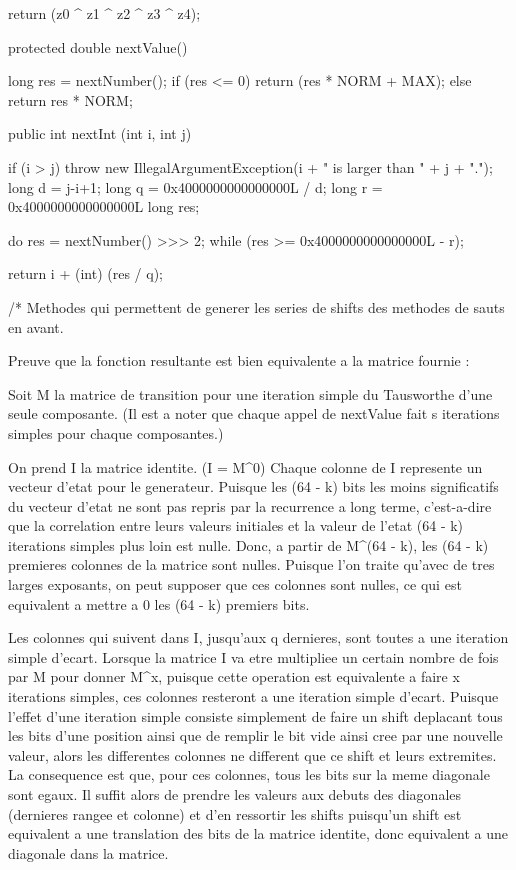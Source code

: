 \begin{code}
\begin{hide}
{       return (z0 ^ z1 ^ z2 ^ z3 ^ z4);
    }


    protected double nextValue() {

        long res = nextNumber();
        if (res <= 0)
            return (res * NORM + MAX);
        else
            return res * NORM;
    }


   public int nextInt (int i, int j) {
      if (i > j)
          throw new IllegalArgumentException(i + " is larger than " + j + ".");
      long d = j-i+1;
      long q = 0x4000000000000000L / d;
      long r = 0x4000000000000000L %
      long res;

      do {
         res = nextNumber() >>> 2;
      } while (res >= 0x4000000000000000L - r);

      return i + (int) (res / q);
   }


    /*
     Methodes qui permettent de generer les series de shifts des
     methodes de sauts en avant.


     Preuve que la fonction resultante est bien equivalente a la matrice
     fournie :

     Soit M la matrice de transition pour une iteration simple du Tausworthe
     d'une seule composante. (Il est a noter que chaque appel de
     nextValue fait s iterations simples pour chaque composantes.)

     On prend I la matrice identite. (I = M^0)
     Chaque colonne de I represente un vecteur d'etat pour le generateur.
     Puisque les (64 - k) bits les moins significatifs du vecteur d'etat
     ne sont pas repris par la recurrence a long terme, c'est-a-dire que
     la correlation entre leurs valeurs initiales et la valeur de l'etat
     (64 - k) iterations simples plus loin est nulle. Donc, a partir de
     M^(64 - k), les (64 - k) premieres colonnes de la matrice sont nulles.
     Puisque l'on traite qu'avec de tres larges exposants, on peut
     supposer que ces colonnes sont nulles, ce qui est equivalent a
     mettre a 0 les (64 - k) premiers bits.

     Les colonnes qui suivent dans I, jusqu'aux q dernieres, sont toutes
     a une iteration simple d'ecart. Lorsque la matrice I va etre multipliee
     un certain nombre de fois par M pour donner M^x, puisque cette operation
     est equivalente a faire x iterations simples, ces colonnes resteront
     a une iteration simple d'ecart. Puisque l'effet d'une iteration simple
     consiste simplement de faire un shift deplacant tous les bits d'une
     position ainsi que de remplir le bit vide ainsi cree par une nouvelle
     valeur, alors les differentes colonnes ne different que ce shift et
     leurs extremites. La consequence est que, pour ces colonnes, tous les
     bits sur la meme diagonale sont egaux. Il suffit alors de prendre les
     valeurs aux debuts des diagonales (dernieres rangee et colonne) et
     d'en ressortir les shifts puisqu'un shift est equivalent a une
     translation des bits de la matrice identite, donc equivalent a une
     diagonale dans la matrice.


\end{hide}
\end{code}
